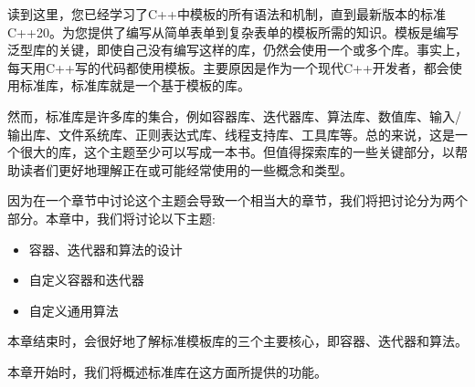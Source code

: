 读到这里，您已经学习了C++中模板的所有语法和机制，直到最新版本的标准C++20。为您提供了编写从简单表单到复杂表单的模板所需的知识。模板是编写泛型库的关键，即使自己没有编写这样的库，仍然会使用一个或多个库。事实上，每天用C++写的代码都使用模板。主要原因是作为一个现代C++开发者，都会使用标准库，标准库就是一个基于模板的库。

然而，标准库是许多库的集合，例如容器库、迭代器库、算法库、数值库、输入/输出库、文件系统库、正则表达式库、线程支持库、工具库等。总的来说，这是一个很大的库，这个主题至少可以写成一本书。但值得探索库的一些关键部分，以帮助读者们更好地理解正在或可能经常使用的一些概念和类型。

因为在一个章节中讨论这个主题会导致一个相当大的章节，我们将把讨论分为两个部分。本章中，我们将讨论以下主题:

\begin{itemize}
\item
容器、迭代器和算法的设计

\item
自定义容器和迭代器

\item
自定义通用算法
\end{itemize}

本章结束时，会很好地了解标准模板库的三个主要核心，即容器、迭代器和算法。

本章开始时，我们将概述标准库在这方面所提供的功能。


